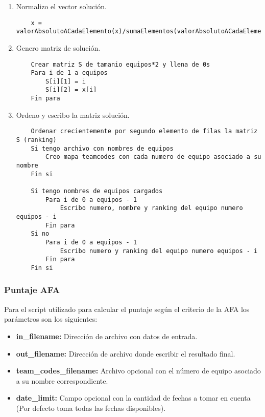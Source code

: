 \begin{enumerate}
	\item Normalizo el vector solución.
	\begin{lstlisting}
	x = valorAbsolutoACadaElemento(x)/sumaElementos(valorAbsolutoACadaElemento(x))
	\end{lstlisting}

	\item Genero matriz de solución.
	\begin{lstlisting}
	Crear matriz S de tamanio equipos*2 y llena de 0s
	Para i de 1 a equipos
		S[i][1] = i
		S[i][2] = x[i]
	Fin para
	\end{lstlisting}

	\item Ordeno y escribo la matriz solución.
	\begin{lstlisting}
	Ordenar crecientemente por segundo elemento de filas la matriz S (ranking)
	Si tengo archivo con nombres de equipos
		Creo mapa teamcodes con cada numero de equipo asociado a su nombre
	Fin si

	Si tengo nombres de equipos cargados
		Para i de 0 a equipos - 1
			Escribo numero, nombre y ranking del equipo numero equipos - i
		Fin para
	Si no
		Para i de 0 a equipos - 1
			Escribo numero y ranking del equipo numero equipos - i
		Fin para
	Fin si
	\end{lstlisting}

\end{enumerate}

\subsubsection{Puntaje AFA}

Para el script utilizado para calcular el puntaje según el criterio de la AFA
los parámetros son los siguientes:

\begin{itemize}
	\item \textbf{in_filename:} Dirección de archivo con datos de entrada.
	\item \textbf{out_filename:} Dirección de archivo donde escribir el
	resultado final.
	\item \textbf{team_codes_filename:} Archivo opcional con el número de equipo
	asociado a su nombre correspondiente.
	\item \textbf{date_limit:} Campo opcional con la cantidad de fechas a tomar
	en cuenta (Por defecto toma todas las fechas disponibles).
\end{itemize}

